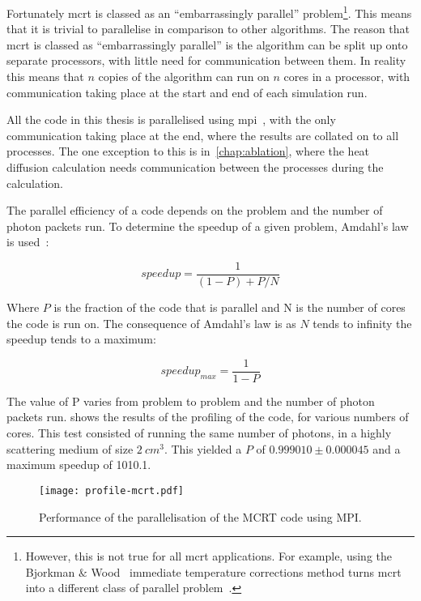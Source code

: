 Fortunately \gls*{mcrt} is classed as an ``embarrassingly parallel'' problem\footnote{However, this is not true for all \gls*{mcrt} applications. For example, using the Bjorkman $\&$ Wood~\cite{bjorkman2001radiative} immediate temperature corrections method turns \gls*{mcrt} into a different class of parallel problem~\cite{robitaille2011hyperion}.}.
This means that it is trivial to parallelise in comparison to other algorithms. 
The reason that \gls*{mcrt} is classed as ``embarrassingly parallel'' is the algorithm can be split up onto separate processors, with little need for communication between them. 
In reality this means that $n$ copies of the algorithm can run on $n$ cores in a processor, with communication taking place at the start and end of each simulation run. 

All the code in this thesis is parallelised using \gls*{mpi}~\cite{gropp2014using,gropp2014usingadv}, with the only communication taking place at the end, where the results are collated on to all processes.
The one exception to this is in~\cref{chap:ablation}, where the heat diffusion calculation needs communication between the processes during the calculation.

The parallel efficiency of a code depends on the problem and the number of photon packets run.
To determine the speedup of a given problem, Amdahl's law is used~\cite{amdahl1967validity}:

\begin{equation}
speedup = \frac{1}{(1-P)+P/N}
\end{equation}

Where $P$ is the fraction of the code that is parallel and N is the number of cores the code is run on.
The consequence of Amdahl's law is as $N$ tends to infinity the speedup tends to a maximum:

\begin{equation}
speedup_{max}=\frac{1}{1-P}
\end{equation}

The value of P varies from problem to problem and the number of photon packets run.
 shows the results of the profiling of the code, for various numbers of cores.
This test consisted of running the same number of photons, in a highly scattering medium of size $2~cm^3$.
This yielded a $P$ of $0.999010 \pm 0.000045$ and a maximum speedup of 1010.1.


\begin{figure}[!htbp]
	\centering
	\texttt{[image: profile-mcrt.pdf]}
	\caption{Performance of the parallelisation of the MCRT code using MPI.}
	\label{fig:paratest}
\end{figure}


